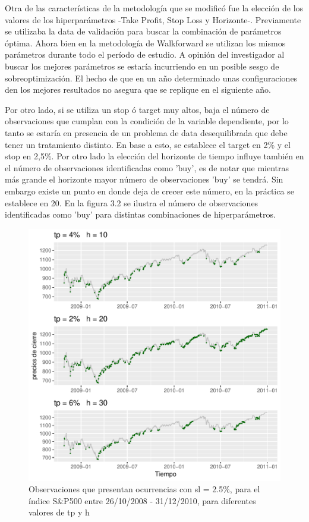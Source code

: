 \documentclass[a4paper,12pt]{Latex/Classes/PhDthesisPSnPDF}
\begin{document}
Otra de las características de la metodología que se modificó fue la elección de los valores de los hiperparámetros -Take Profit, Stop Loss y Horizonte-. Previamente se utilizaba la data de validación para buscar la combinación de parámetros óptima. Ahora bien en la metodología de Walkforward se utilizan los mismos parámetros durante todo el período de estudio. A opinión del investigador al buscar los mejores parámetros se estaría incurriendo en un posible sesgo de sobreoptimización. El hecho de que en un año determinado unas configuraciones den los mejores resultados no asegura que se replique en el siguiente año.

Por otro lado, si se utiliza un stop ó target muy altos, baja el número de observaciones que cumplan con la condición de la variable dependiente, por lo tanto se estaría en presencia de un problema de data desequilibrada que debe tener un tratamiento distinto. En base a esto, se establece el target en 2\% y el stop en 2,5\%. Por otro lado la elección del horizonte de tiempo influye también en el número de observaciones identificadas como 'buy', es de notar que mientras más grande el horizonte mayor número de observaciones 'buy' se tendrá. Sin embargo existe un punto en donde deja de crecer este número, en la práctica se establece en 20. En la figura 3.2 se ilustra el número de observaciones identificadas como 'buy' para distintas combinaciones de hiperparámetros.


\begin{figure}[H]
\centering
\includegraphics{main-003}
\caption{Observaciones que presentan ocurrencias con sl = 2.5\%, para el índice S\&P500 entre 26/10/2008 - 31/12/2010, para diferentes valores de tp y h}
\end{figure}
\end{document}
